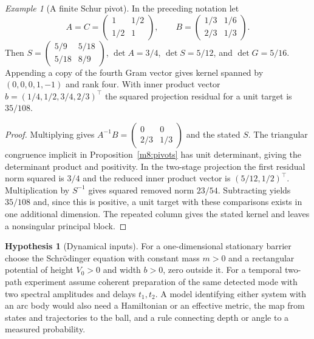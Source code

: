 \documentclass[11pt,reqno]{amsart}
\theoremstyle{definition}
\newtheorem{hypothesis}[theorem]{Hypothesis}
\theoremstyle{remark}
\newtheorem{example}[theorem]{Example}
\numberwithin{equation}{section}
\begin{document}
\begin{example}[A finite Schur pivot]\label{m8:pivot-example}
In the preceding notation let
\[
 A=C=\begin{pmatrix}1&1/2\\1/2&1\end{pmatrix},\qquad
 B=\begin{pmatrix}1/3&1/6\\2/3&1/3\end{pmatrix}.
\]
Then $S=\left(\begin{smallmatrix}5/9&5/18\\5/18&8/9\end{smallmatrix}\right)$,
$\det A=3/4$, $\det S=5/12$, and $\det G=5/16$. Appending
a copy of the fourth Gram vector gives kernel spanned by
$(0,0,0,1,-1)$ and rank four. With inner product vector
$b=(1/4,1/2,3/4,2/3)^\top$ the squared projection residual for
a unit target is $35/108$.
\end{example}
\begin{proof}
Multiplying gives $A^{-1}B=\left(\begin{smallmatrix}0&0\\2/3&1/3
\end{smallmatrix}\right)$ and the stated $S$. The triangular
congruence implicit in Proposition~\ref{m8:pivots} has unit
determinant, giving the determinant product and positivity.
In the two-stage projection the first residual norm squared is
$3/4$ and the reduced inner product vector is $(5/12,1/2)^\top$.
Multiplication by $S^{-1}$ gives squared removed norm $23/54$.
Subtracting yields $35/108$ and, since this is positive, a unit
target with these comparisons exists in one additional dimension.
The repeated column gives the stated kernel and leaves a nonsingular
principal block.
\end{proof}

\begin{hypothesis}[Dynamical inputs]\label{m8:dynamics}
For a one-dimensional stationary barrier choose the Schr\"odinger
equation with constant mass $m>0$ and a rectangular potential of
height $V_0>0$ and width $b>0$, zero outside it. For a temporal
two-path experiment assume coherent preparation of the same detected
mode with two spectral amplitudes and delays $t_1,t_2$.
A model identifying either system with an arc body would also
need a Hamiltonian or an effective metric, the map from states
and trajectories to the ball, and a rule connecting depth or angle
to a measured probability.
\end{hypothesis}
\end{document}
